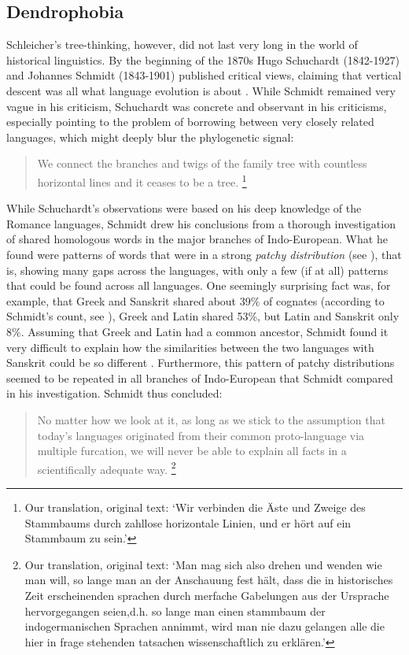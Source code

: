 \documentclass[svgnames,12pt]{scrartcl}
\begin{document}
{\subsection{Dendrophobia}
Schleicher's tree-thinking, however, did not last very long in the world of historical linguistics.
By the beginning of the 1870s Hugo Schuchardt (1842-1927) and Johannes Schmidt (1843-1901) published
critical views, claiming that vertical descent was all what language evolution is about
\citep{Schmidt1872,Schuchardt1870}. While Schmidt remained very vague in his criticism, Schuchardt
was concrete and observant in his criticisms, especially pointing to the problem of borrowing
between very closely related languages, which might deeply blur the phylogenetic signal: 

\begin{quote}
\small We connect the branches and twigs of the family tree with countless horizontal lines and it ceases
to be a tree. \citep[9]{Schuchardt1870}\footnote{Our translation, original text: `Wir verbinden die
Äste und Zweige des Stammbaums durch zahllose horizontale Linien, und er hört auf ein Stammbaum zu
sein.'} 
\end{quote}

While Schuchardt's observations were based on his deep knowledge of the Romance languages, Schmidt
drew his conclusions from a thorough investigation of shared homologous words in the major branches
of Indo-European. What he found were patterns of words that were in a strong \emph{patchy
distribution} (see \citealt{List2014a}), that is, showing many gaps across the languages, with only
a few (if at all) patterns that could be found across all languages. One seemingly surprising fact
was, for example, that Greek and Sanskrit shared about 39\% of cognates (according to Schmidt's
count, see \citealt{Geisler2013}), Greek and Latin shared 53\%, but Latin and Sanskrit only 8\%.
Assuming that Greek and Latin had a common ancestor, Schmidt found it very difficult to explain how
the similarities between the two languages with Sanskrit could be so different
\citep[24]{Schmidt1872}. Furthermore, this pattern of patchy distributions seemed to be repeated in
all branches of Indo-European that Schmidt compared in his investigation. Schmidt thus concluded: 

\begin{quote}
     \small No matter how we look at it, as long as we stick to the assumption that today's languages
     originated from their common proto-language via multiple furcation, we will never be able to
     explain all facts in a scientifically adequate way. \citep[17]{Schmidt1872}\footnote{Our
     translation, original text: `Man mag sich also drehen und wenden wie man will, so lange man an
     der Anschauung fest hält, dass die in historisches Zeit erscheinenden sprachen durch merfache
     Gabelungen aus der Ursprache hervorgegangen seien,d.h. so lange man einen stammbaum der
     indogermanischen Sprachen annimmt, wird man nie dazu gelangen alle die hier in frage stehenden
     tatsachen wissenschaftlich zu erklären.'} 
\end{quote}

}
\end{document}

